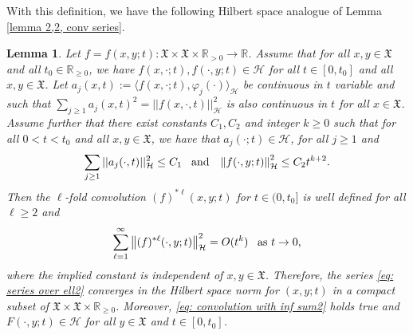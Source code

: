 \documentclass[11pt,reqno]{amsart}
\newtheorem{lemma}[theorem]{Lemma}
\theoremstyle{remark}
\theoremstyle{definition}
\numberwithin{theorem}{section} \numberwithin{equation}{section}
\newcommand{\X}{\mathfrak{X}}
\begin{document}
With this definition, we have the following Hilbert space analogue of Lemma \ref{lemma 2,2, conv series}.

\begin{lemma}\label{lemma 2,2, conv series Hilb}
  Let $f=f(x,y;t):\X\times \X\times\mathbb{R}_{>0}\to\mathbb{R}$.
Assume that for all $x,y\in \X$ and all $t_{0} \in \mathbb{R}_{\geq0}$, we have $f(x,\cdot;t), f(\cdot, y;t) \in \mathcal{H}$ for all $t\in [0,t_0]$ and all $x,y\in\X$. Let  $a_j(x,t):= \langle f(x,\cdot; t), \varphi_j(\cdot) \rangle_{\mathcal{H}}$ be continuous in $t$ variable and such that $\sum_{j\geq 1}a_j(x,t)^2 =||f(x,\cdot,t)||_{\mathcal{H}}^2$ is also continuous in $t$ for all $x\in\X$. Assume further that  there exist constants $C_1, C_2$ and integer $k\geq 0$
such that for all $0<t<t_{0}$ and all $x,y \in \X$, we have that $a_j(\cdot ;t)\in\mathcal{H}$, for all $j\geq 1$ and
$$
\sum_{j\geq 1} ||a_j(\cdot,t)||^2_{\mathcal{H}}\leq C_{1}
  \,\,\,\,\,
  \text{\rm and}
  \,\,\,\,\,
  \left\|f(\cdot, y;t)\right\|_{\mathcal{H}}^2\leq C_{2}t^{k+2}.
$$
Then the $\ell$-fold
convolution $(f)^{\ast\ell}(x,y;t)$ for $t\in(0,t_0]$ is well defined for all $\ell\geq 2$ and
\begin{equation}\label{eq:series_bound2 Hilb}
\sum_{\ell=1}^{\infty}\left\|(f)^{\ast\ell}(\cdot,y;t)\right\|_{\mathcal{H}}^2
=O(t^{k})
\,\,\,\,\,
\text{\rm as $t\to 0$,}
\end{equation}
where the implied constant is independent of $x,y\in \X$.
Therefore, the series  \eqref{eq: series over ell2}
converges in the Hilbert space norm for $(x,y;t)$ in a compact subset of $\X\times \X\times\mathbb{R}_{\geq0}$. Moreover,
\eqref{eq: convolution with inf sum2} holds true and $F(\cdot, y;t) \in \mathcal{H}$ for all $y\in\X$ and $t\in[0,t_0]$.
\end{lemma}
\end{document}
